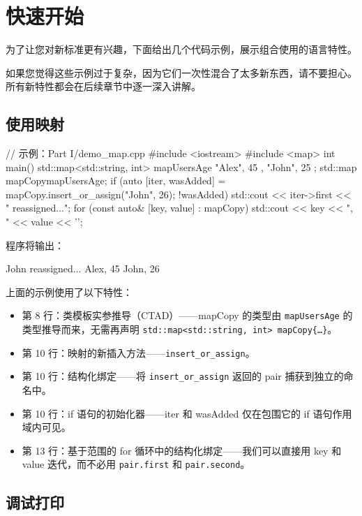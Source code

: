 \section{快速开始}

为了让您对新标准更有兴趣，下面给出几个代码示例，展示组合使用的语言特性。

如果您觉得这些示例过于复杂，因为它们一次性混合了太多新东西，请不要担心。所有新特性都会在后续章节中逐一深入讲解。

\subsection{使用映射}

\begin{codebox}[cpp]
// 示例：Part I/demo_map.cpp
#include <iostream>
#include <map>
int main() {
std::map<std::string, int> mapUsersAge { { "Alex", 45 }, { "John", 25 } };
std::map mapCopy{mapUsersAge};
if (auto [iter, wasAdded] = mapCopy.insert_or_assign("John", 26); !wasAdded)
std::cout << iter->first << " reassigned...\n";
for (const auto& [key, value] : mapCopy)
std::cout << key << ", " << value << '\n';
}
\end{codebox}

程序将输出：

\begin{codebox}[cpp]
John reassigned...
Alex, 45
John, 26
\end{codebox}

上面的示例使用了以下特性：

\begin{itemize}
\item 第 8 行：类模板实参推导（CTAD）——mapCopy 的类型由 \texttt{mapUsersAge} 的类型推导而来，无需再声明 \texttt{std::map<std::string, int> mapCopy\{\dots\}}。
\item 第 10 行：映射的新插入方法——\texttt{insert\_or\_assign}。
\item 第 10 行：结构化绑定——将 \texttt{insert\_or\_assign} 返回的 pair 捕获到独立的命名中。
\item 第 10 行：if 语句的初始化器——iter 和 wasAdded 仅在包围它的 if 语句作用域内可见。
\item 第 13 行：基于范围的 for 循环中的结构化绑定——我们可以直接用 key 和 value 迭代，而不必用 \texttt{pair.first} 和 \texttt{pair.second}。
\end{itemize}

\subsection{调试打印}

